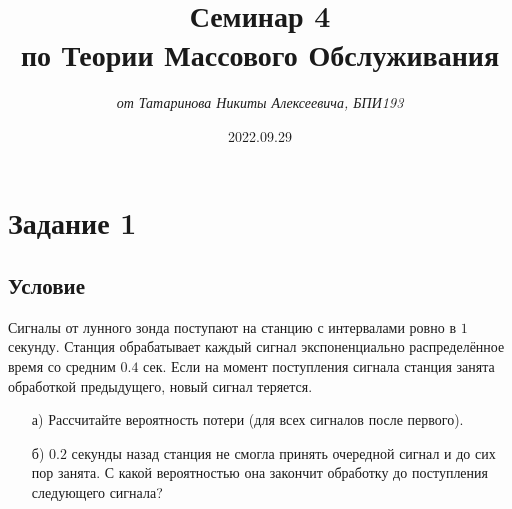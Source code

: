 \documentclass{article}
\title{\textbf{Семинар 4\\по Теории Массового Обслуживания}}
\author{\textit{от Татаринова Никиты Алексеевича, БПИ193}}
\date{2022.09.29}
\begin{document}
\maketitle
\section*{Задание 1}
\subsection*{Условие}
Сигналы от лунного зонда поступают на станцию с интервалами ровно в $ 1 $ секунду. Станция обрабатывает каждый сигнал экспоненциально распределённое время со средним $ 0.4 $ сек. Если на момент поступления сигнала станция занята обработкой предыдущего, новый сигнал теряется.
\begin{enumerate}
\item[а)] Рассчитайте вероятность потери (для всех сигналов после первого).
\item[б)] $ 0.2 $ секунды назад станция не смогла принять очередной сигнал и до сих пор занята. С какой вероятностью она закончит обработку до поступления следующего сигнала?
\end{enumerate}
\end{document}
